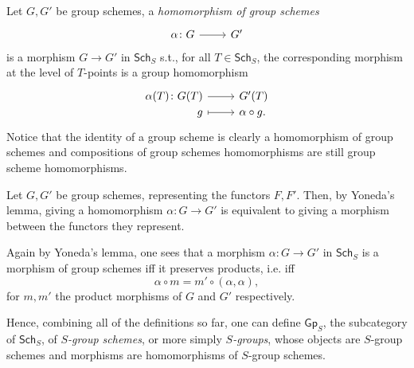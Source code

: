 \documentclass[../Main]{subfiles}
\begin{document}
\begin{defn}
	Let $G, G'$ be group schemes, a {\em homomorphism of group schemes}
	\begin{equation*}
		\begin{tikzcd}
			\alpha\colon G \arrow[r, "", rightarrow] &
			G'
		\end{tikzcd}
	\end{equation*} 
	is a morphism $G \to G'$ in $\mathsf{Sch}_{ S }$ s.t., for all
	$T \in \mathsf{Sch}_{ S }$, the corresponding morphism at the level of $T$-points
	is a group homomorphism
	\begin{equation*}
	\begin{tikzcd}[row sep = 0ex
		,/tikz/column 1/.append style={anchor=base east}
		,/tikz/column 2/.append style={anchor=base west}]
		\alpha(T)\colon G(T) \arrow[r, "", rightarrow] &
		G'(T) \\
		g \arrow[r, "", mapsto] & \alpha \circ g.
	\end{tikzcd}
	\end{equation*} 
	Notice that the identity of a group scheme is clearly a homomorphism of group
	schemes and compositions of group schemes homomorphisms are still
	group scheme homomorphisms.
\end{defn}


\begin{rem}
	Let $G, G'$ be group schemes, representing the functors $F,F'$.
	Then, by Yoneda's lemma, giving a homomorphism $\alpha\colon G \to G'$
	is equivalent to giving a morphism between the functors they represent.

	Again by Yoneda's lemma, one sees that a morphism $\alpha\colon G \to G'$
	in $\mathsf{Sch}_{ S }$ is a morphism of group schemes iff
	it preserves products, i.e. iff
	\begin{equation*}
		\alpha \circ m = m' \circ (\alpha, \alpha)
	,\end{equation*} 
	for $m, m'$ the product morphisms of $G$ and $G'$ respectively.
\end{rem}


\begin{defn}
	Hence, combining all of the definitions so far, 
	one can define $\mathsf{Gp}_S$, the subcategory of $\mathsf{Sch}_{ S }$,
	of {\em $S$-group schemes}, or more simply {\em $S$-groups},
	whose objects are $S$-group schemes
	and morphisms are homomorphisms of $S$-group schemes.
\end{defn}
\end{document}
